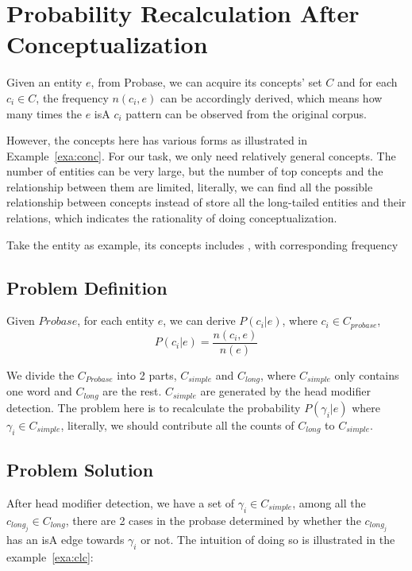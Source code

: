\section{Probability Recalculation After Conceptualization}
\label{sec:conceptualization}
Given an entity $e$, from Probase, we can acquire its concepts' set $C$ and for each $c_i \in C$, the frequency $n(c_i,e)$ can be accordingly derived, which means how many times the $e$ isA $c_i$ pattern can be observed from the original corpus.

However, the concepts here has various forms as illustrated in Example~\ref{exa:conc}. For our task, we only need relatively general concepts. The number of entities can be very large, but the number of top concepts and the relationship between them are limited, literally, we can find all the possible relationship between concepts instead of store all the long-tailed entities and their relations, which indicates the rationality of doing conceptualization.

\begin{example}
\label{exa:conc}
Take the entity  as example, its concepts includes ,  with corresponding frequency 
\end{example}



\subsection{Problem Definition}
Given  $Probase$, for each entity $e$, we can derive $P(c_i|e)$, where $c_i \in C_{probase}$,
$$P(c_i|e)=\frac{n(c_i,e)}{n(e)}$$

We divide the $C_{Probase}$ into 2 parts, $C_{simple}$ and $C_{long}$, where $C_{simple}$ only contains one word and $C_{long}$ are the rest.
$C_{simple}$ are generated by the head modifier detection. The problem here is to recalculate the probability $P(\gamma_i|e)$ where $\gamma_i \in C_{simple}$, literally, we should contribute all the counts of $C_{long}$ to $C_{simple}$.

\subsection{Problem Solution}
After head modifier detection, we have a set of $\gamma_i \in C_{simple}$, among all the $c_{long_j}\in C_{long}$, there are 2 cases in the probase determined by whether the $c_{long_j}$ has an isA edge towards $\gamma_i$ or not.
The intuition of doing so is illustrated in the example~\ref{exa:clc}:

